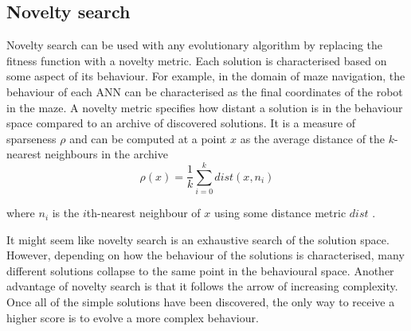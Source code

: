 \subsection{Novelty search}
Novelty search can be used with any evolutionary algorithm by replacing the fitness
function with a novelty metric. Each solution is characterised based on some aspect
of its behaviour. For example, in the domain of maze navigation,
the behaviour of each ANN can be characterised as the
final coordinates of the robot in the maze. A novelty metric specifies how distant a solution
is in the behaviour space compared to an archive of discovered solutions. It is a measure
of sparseness $\rho$ and can be computed at a point $x$ as the average distance of the
$k$-nearest neighbours in the archive
\[
    \rho(x) = \frac{1}{k} \sum_{i=0}^{k} dist(x, n_{i})
\]

where $n_{i}$ is the $i$th-nearest neighbour of $x$ using some distance metric $dist$ \cite{novelty_alone}.

It might seem like novelty search is an exhaustive search of the solution space. However,
depending on how the behaviour of the solutions is characterised, many different solutions
collapse to the same point in the behavioural space. Another advantage of novelty search
is that it follows the arrow of increasing complexity. Once all of the simple solutions
have been discovered, the only way to receive a higher score is to evolve a more complex
behaviour.